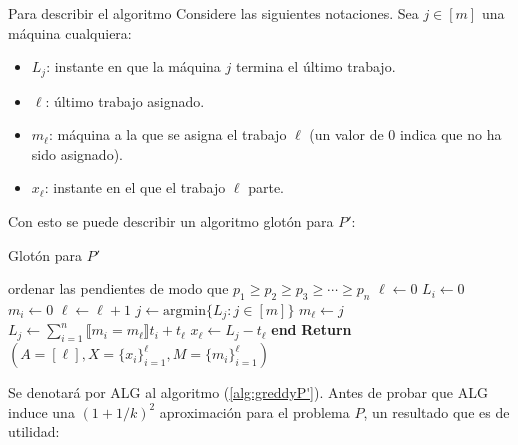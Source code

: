 \documentclass[10pt]{article}
\theoremstyle{plain}
\theoremstyle{definition}
\begin{document}
Para describir el algoritmo Considere las siguientes notaciones. Sea $j \in [m]$ una m\'aquina cualquiera:
\begin{itemize}
\item $L_j$: instante en que la máquina $j$ termina el \'ultimo trabajo.
\item $\ell$: \'ultimo trabajo asignado.
\item $m_\ell$: m\'aquina a la que se asigna el trabajo $\ell$ (un valor de $0$ indica que no ha sido asignado).
\item $x_\ell$: instante en el que el trabajo $\ell$ parte.
\end{itemize}
Con esto se puede describir un algoritmo glot\'on para $P'$:
\begin{algorithm}[H]
\caption{Glotón para $P'$}\label{alg:greddyP'}
\begin{algorithmic}[1]

\State ordenar las pendientes de modo que $p_1 \geq p_2 \geq p_3 \geq \cdots \geq p_n$  \;
\State $\ell \gets 0$\;
	\State $L_i \gets 0$\;
	\State $m_i \gets 0$\;
\EndFor
{}
	\State $\ell \gets \ell+1$\;
	\State $j \gets \text{argmin}\{L_j: j \in [m]\}$\;
	\State $m_\ell \gets j$\;
	\State $L_j \gets \sum_{i = 1}^n \llbracket m_i=m_\ell\rrbracket t_i + t_\ell$
	\State $x_\ell \gets L_j-t_\ell$\;
\EndWhile
\State \textbf{end}
\State \textbf{Return } $(A = [\ell], X = \{x_i\}_{i=1}^\ell, M = \{m_i\}_{i=1}^{\ell})$
\end{algorithmic}
\end{algorithm}


Se denotará por ALG al algoritmo (\ref{alg:greddyP'}). Antes de probar que ALG induce una $(1+1/k)^2$ aproximación para el problema $P$, un resultado que es de utilidad:
\end{document}
